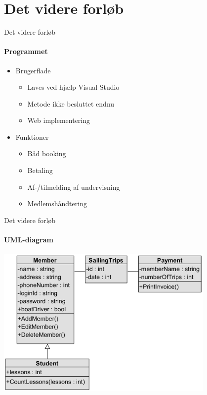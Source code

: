 \section{Det videre forløb}

\begin{frame}{Det videre forløb}
\framesubtitle{Programmet}

	\begin{itemize}
	\item Brugerflade
		\begin{itemize}
		\item Laves ved hjælp Visual Studio
		\item Metode ikke besluttet endnu
		\item Web implementering 
		\end{itemize}
		
	\item Funktioner
		\begin{itemize}
		\item Båd booking
		\item Betaling
		\item Af-/tilmelding af undervisning
		\item Medlemshåndtering
		\end{itemize}	
		
	\end{itemize}

\end{frame}

\begin{frame}{Det videre forløb}
\framesubtitle{UML-diagram}

\includegraphics[width=0.8\textwidth,height=0.8\textheight,keepaspectratio]{images/UML-diagram.png}

\end{frame}